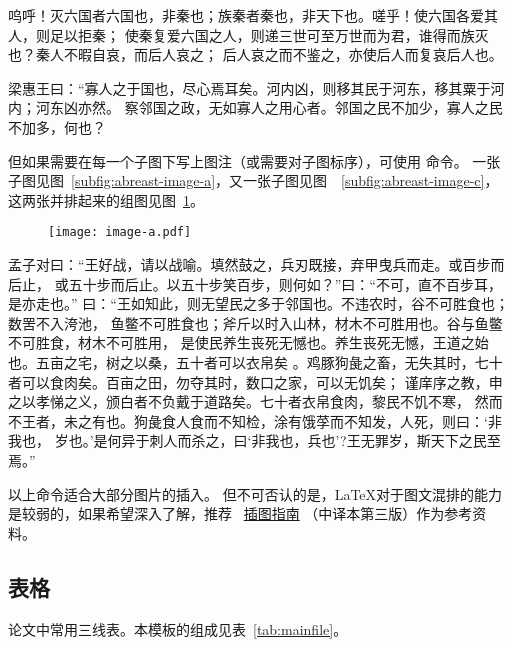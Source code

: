 呜呼！灭六国者六国也，非秦也；族秦者秦也，非天下也。嗟乎！使六国各爱其人，则足以拒秦；
使秦复爱六国之人，则递三世可至万世而为君，谁得而族灭也？秦人不暇自哀，而后人哀之；
后人哀之而不鉴之，亦使后人而复哀后人也。

梁惠王曰：“寡人之于国也，尽心焉耳矣。河内凶，则移其民于河东，移其粟于河内；河东凶亦然。
察邻国之政，无如寡人之用心者。邻国之民不加少，寡人之民不加多，何也？

但如果需要在每一个子图下写上图注（或需要对子图标序），可使用  命令。
一张子图见图~\ref{subfig:abreast-image-a}，又一张子图见图~~\ref{subfig:abreast-image-c}，这两张并排起来的组图见图~\ref{fig:abreast-image-a-c}。

\begin{figure}[htbp]
	\centering
	{\texttt{[image: image-a.pdf]}}
	\hspace{1cm}
	\label{fig:abreast-image-a-c}
\end{figure}

孟子对曰：“王好战，请以战喻。填然鼓之，兵刃既接，弃甲曳兵而走。或百步而后止，
或五十步而后止。以五十步笑百步，则何如？”曰：“不可，直不百步耳，是亦走也。”
曰：“王如知此，则无望民之多于邻国也。不违农时，谷不可胜食也；数罟不入洿池，
鱼鳖不可胜食也；斧斤以时入山林，材木不可胜用也。谷与鱼鳖不可胜食，材木不可胜用，
是使民养生丧死无憾也。养生丧死无憾，王道之始也。五亩之宅，树之以桑，五十者可以衣帛矣
。鸡豚狗彘之畜，无失其时，七十者可以食肉矣。百亩之田，勿夺其时，数口之家，可以无饥矣；
谨庠序之教，申之以孝悌之义，颁白者不负戴于道路矣。七十者衣帛食肉，黎民不饥不寒，
然而不王者，未之有也。狗彘食人食而不知检，涂有饿莩而不知发，人死，则曰：‘非我也，
岁也。’是何异于刺人而杀之，曰‘非我也，兵也’?王无罪岁，斯天下之民至焉。”

以上命令适合大部分图片的插入。
但不可否认的是，\LaTeX{}对于图文混排的能力是较弱的，如果希望深入了解，推荐~
\href{https://github.com/WenboSheng/epslatex-cn}{\LaTeXe 插图指南}
（中译本第三版）作为参考资料。

\subsection{表格}\label{subsec:tab}
论文中常用三线表。本模板的组成见表~\ref{tab:mainfile}。

